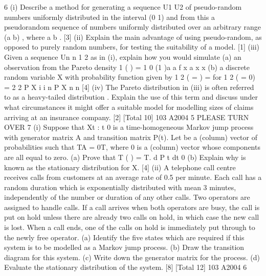 \documentclass[a4paper,12pt]{article}
\begin{document}
\begin{enumerate}

6 (i) Describe a method for generating a sequence U1 U2 of pseudo-random
numbers uniformly distributed in the interval (0 1) and from this a pseudorandom
sequence of numbers uniformly distributed over an arbitrary
range (a b) , where a b . [3]
(ii) Explain the main advantage of using pseudo-random, as opposed to purely
random numbers, for testing the suitability of a model. [1]
(iii) Given a sequence {Un n 1 2 } as in (i), explain how you would simulate
(a) an observation from the Pareto density
1 ( ) = 1 0
(1 )a
a
f x a x
x
(b) a discrete random variable X with probability function given by
1 2
( = ) = for 1 2 ( = 0) =
2 2
P X i i n P X
n n
[4]
(iv) The Pareto distribution in (iii) is often referred to as a heavy-tailed
distribution . Explain the use of this term and discuss under what
circumstances it might offer a suitable model for modelling sizes of claims
arriving at an insurance company. [2]
[Total 10]
103 A2004 5 PLEASE TURN OVER
7 (i) Suppose that {Xt : t 0} is a time-homogeneous Markov jump process with
generator matrix A and transition matrix P(t). Let be a (column) vector of
probabilities such that TA = 0T, where 0 is a (column) vector whose
components are all equal to zero.
(a) Prove that
T ( ) = T. d
P t
dt
0
(b) Explain why is known as the stationary distribution for X.
[4]
(ii) A telephone call centre receives calls from customers at an average rate of 0.5
per minute. Each call has a random duration which is exponentially
distributed with mean 3 minutes, independently of the number or duration of
any other calls. Two operators are assigned to handle calls. If a call arrives
when both operators are busy, the call is put on hold unless there are already
two calls on hold, in which case the new call is lost. When a call ends, one of
the calls on hold is immediately put through to the newly free operator.
(a) Identify the five states which are required if this system is to be
modelled as a Markov jump process.
(b) Draw the transition diagram for this system.
(c) Write down the generator matrix for the process.
(d) Evaluate the stationary distribution of the system.
[8]
[Total 12]
103 A2004 6



\end{enumerate}
\end{document}
